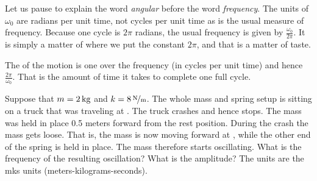 \documentclass{ximera}
\begin{document}
Let us pause to explain the word \emph{angular} before the word \emph{frequency}. The units of $\omega_0$ are radians per unit time, not cycles per unit time as is the usual measure of frequency.  Because one cycle is $2 \pi$ radians, the usual frequency is given by $\frac{\omega_0}{2\pi}$. It is simply a matter of where we put the constant $2\pi$, and that is a matter of taste.

The \emph{} of the motion is one over the frequency (in cycles per unit time) and hence $\frac{2\pi}{\omega_0}$.  That is the amount of time it takes to complete one full cycle.


\begin{example}
    Suppose that $m=\unit[2]{kg}$ and $k=\unitfrac[8]{N}{m}$. The whole mass and spring setup is sitting on a truck that was traveling at . The truck crashes and hence stops. The mass was held in place 0.5 meters forward from the rest position.  During the crash the mass gets loose.  That is, the mass is now moving forward at , while the other end of the spring is held in place.  The mass therefore starts oscillating. What is the frequency of the resulting oscillation?  What is the amplitude? The units are the mks units (meters-kilograms-seconds).
\end{example}
\end{document}
